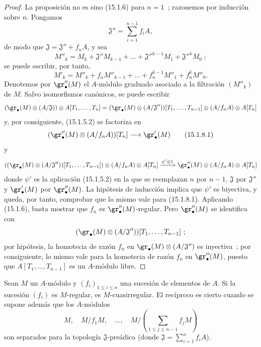 \begin{proof}
La proposición no es sino (15.1.6) para $n=1$~; razonemos por inducción sobre
$n$. Pongamos
\[
  \mathfrak{J}''=\sum_{i=1}^{n-1}f_iA,
\]
de modo que $\mathfrak{J}=\mathfrak{J}''+f_nA$, y sea
\[
  M''_k=M_k+\mathfrak{J}''M_{k-1}+\ldots+
  \mathfrak{J}''^{k-1}M_1+\mathfrak{J}''^kM_0~;
\]
se puede escribir, por tanto,
\[
  M'_k=M''_k+f_nM''_{k-1}+\ldots+f_n^{k-1}M''_1+f_n^kM''_0.
\]
Denotemos por $\gr''_\bullet(M)$ el $A$-módulo graduado asociado a la filtración
$(M''_k)$ de $M$. Salvo isomorfismos canónicos, se puede escribir
\[
  (\gr_\bullet(M)\otimes(A/\mathfrak{J}))\otimes A[T_1,\ldots,T_n]
  =
  (\gr_\bullet(M)\otimes(A/\mathfrak{J}''))[T_1,\ldots,T_{n-1}]
  \otimes(A/f_nA)\otimes A[T_n]
\]
y, por consiguiente, (15.1.5.2) se factoriza en
\[
  (\gr''_\bullet(M)\otimes(A/f_nA))[T_n]\longrightarrow\gr'_\bullet(M)
  \tag{15.1.8.1}\label{0.15.1.8.1-es}
\]
y
\[
  ((\gr_\bullet(M)\otimes(A/\mathfrak{J}''))[T_1,\ldots,T_{n-1}])
  \otimes(A/f_nA)\otimes A[T_n]
  \xrightarrow{\psi'\otimes1}
  \gr''_\bullet(M)\otimes(A/f_nA)\otimes A[T_n]
\]
donde $\psi'$ es la aplicación (15.1.5.2) en la que se reemplazan $n$ por
$n-1$, $\mathfrak{J}$ por $\mathfrak{J}''$ y $\gr'_\bullet(M)$ por
$\gr''_\bullet(M)$. La hipótesis de inducción implica que $\psi'$ es
biyectiva, y queda, por tanto, comprobar que lo mismo vale para (15.1.8.1).
Aplicando (15.1.6), basta mostrar que $f_n$ es
$\gr''_\bullet(M)$-regular. Pero $\gr''_\bullet(M)$ se identifica con
\[
  (\gr_\bullet(M)\otimes(A/\mathfrak{J}''))
  [T_1,\ldots,T_{n-1}]~;
\]
por hipótesis, la homotecia de razón $f_n$ en
$\gr_\bullet(M)\otimes(A/\mathfrak{J}'')$ es inyectiva~; por consiguiente, lo
mismo vale para la homotecia de razón $f_n$ en $\gr''_\bullet(M)$, puesto que
$A[T_1,\ldots,T_{n-1}]$ es un $A$-módulo libre.
\end{proof}
\begin{proposition}[15.1.9]
\label{0.15.1.9-es}
Sean $M$ un $A$-módulo y $(f_i)_{1\leq i\leq n}$ una sucesión de elementos de
$A$. Si la sucesión $(f_i)$ es $M$-regular, es $M$-cuasirregular. El recíproco
es cierto cuando se supone además que los $A$-módulos
\[
  M,\quad M/f_1M,\quad\ldots,\quad
  M/\left(\sum_{1\leq j\leq n-1}f_jM\right)
\]
son separados para la topología $\mathfrak{J}$-preádica (donde
$\mathfrak{J}=\sum_{i=1}^n f_iA$).
\end{proposition}

